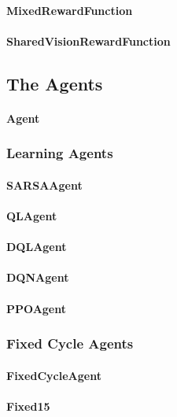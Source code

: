 \paragraph{MixedRewardFunction}
\paragraph{SharedVisionRewardFunction}

\subsection{The Agents}

\paragraph{Agent}

\subsubsection{Learning Agents}

\paragraph{SARSAAgent}
\paragraph{QLAgent}
\paragraph{DQLAgent}
\paragraph{DQNAgent}
\paragraph{PPOAgent}

\subsubsection{Fixed Cycle Agents}

\paragraph{FixedCycleAgent}
\paragraph{Fixed15}
